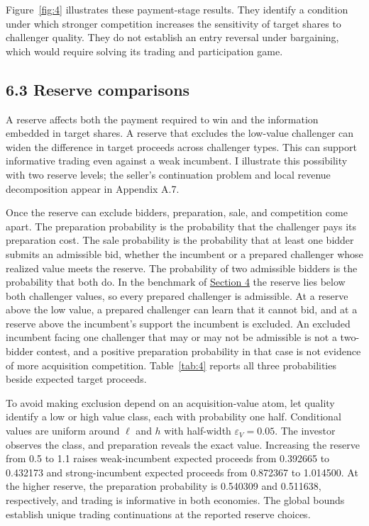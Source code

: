 \documentclass[
  12pt,
]{article}
\begin{document}
Figure~\ref{fig:4} illustrates these payment-stage results. They
identify a condition under which stronger competition increases the
sensitivity of target shares to challenger quality. They do not
establish an entry reversal under bargaining, which would require
solving its trading and participation game.

\subsection{6.3 Reserve comparisons}\label{sec-design}

A reserve affects both the payment required to win and the information
embedded in target shares. A reserve that excludes the low-value
challenger can widen the difference in target proceeds across challenger
types. This can support informative trading even against a weak
incumbent. I illustrate this possibility with two reserve levels; the
seller's continuation problem and local revenue decomposition appear in
Appendix A.7.

Once the reserve can exclude bidders, preparation, sale, and competition
come apart. The preparation probability is the probability that the
challenger pays its preparation cost. The sale probability is the
probability that at least one bidder submits an admissible bid, whether
the incumbent or a prepared challenger whose realized value meets the
reserve. The probability of two admissible bidders is the probability
that both do. In the benchmark of \hyperref[sec-results]{Section 4} the
reserve lies below both challenger values, so every prepared challenger
is admissible. At a reserve above the low value, a prepared challenger
can learn that it cannot bid, and at a reserve above the incumbent's
support the incumbent is excluded. An excluded incumbent facing one
challenger that may or may not be admissible is not a two-bidder
contest, and a positive preparation probability in that case is not
evidence of more acquisition competition. Table~\ref{tab:4} reports all
three probabilities beside expected target proceeds.

To avoid making exclusion depend on an acquisition-value atom, let
quality identify a low or high value class, each with probability one
half. Conditional values are uniform around \(\ell\) and \(h\) with
half-width \(\varepsilon_V=0.05\). The investor observes the class, and
preparation reveals the exact value. Increasing the reserve from 0.5 to
1.1 raises weak-incumbent expected proceeds from 0.392665 to 0.432173
and strong-incumbent expected proceeds from 0.872367 to 1.014500. At the
higher reserve, the preparation probability is 0.540309 and 0.511638,
respectively, and trading is informative in both economies. The global
bounds establish unique trading continuations at the reported reserve
choices.
\end{document}
